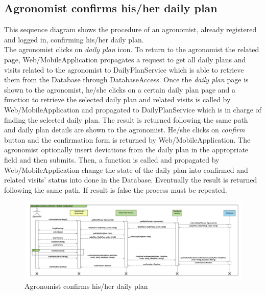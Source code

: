 \subsection{Agronomist confirms his/her daily plan}

This sequence diagram shows the procedure of an agronomist, already registered and logged in, confirming his/her daily plan.\\
The agronomist clicks on \textit{daily plan} icon. To return to the agronomist the related page, Web/MobileApplication propagates a request to get all daily plans and visits related to the agronomist to DailyPlanService which is able to retrieve them from the Database through DatabaseAccess. 
Once the \textit{daily plan} page is shown to the agronomist, he/she clicks on a certain daily plan page and a function to retrieve the selected daily plan and related visits is called by Web/MobileApplication and propagated to DailyPlanService which is in charge of finding the selected daily plan. The result is returned following the same path and daily plan details are shown to the agronomist. He/she clicks on \textit{confirm} button and the confirmation form is returned by Web/MobileApplication. The agronomist optionally insert deviations from the daily plan in the appropriate field and then submits. Then, a function is called and propagated by Web/MobileApplication change the state of the daily plan into confirmed and related visits' status into done in the Database. 
Eventually the result is returned following the same path.
If result is false the process must be repeated. 

\newpage
\begin{landscape}
\begin{figure}[h]
\vspace*{-2cm}
\noindent
\centering
\centerline{\includegraphics[scale= 0.108]{./Images/Sequence diagram/Agronomist confirms his_her daily plan.png}}
    \caption{Agronomist confirms his/her daily plan}
    \vspace*{-12cm}
\end{figure}
\fillandplacepagenumber
\end{landscape}

